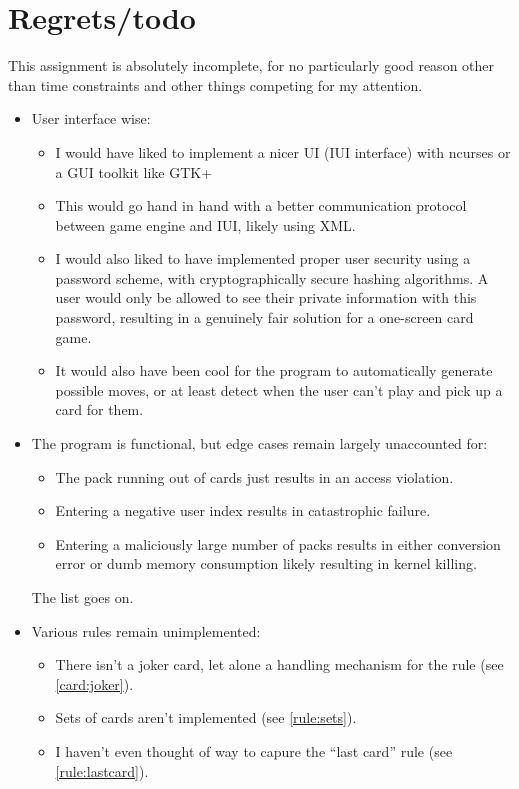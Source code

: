 \documentclass[fleqn,a4paper,11pt]{article}
\begin{document}
    \section{Regrets/todo}

    This assignment is absolutely incomplete, for no particularly good reason
    other than time constraints and other things competing for my attention.

    \begin{itemize}
    \item User interface wise:
        \begin{itemize}
        \item I would have liked to implement a nicer UI (IUI interface) with
              ncurses or a GUI toolkit like GTK+
        \item This would go hand in hand with a better communication protocol
              between game engine and IUI, likely using XML.
        \item I would also liked to have implemented proper user security using
              a password scheme, with cryptographically secure hashing
              algorithms. A user would only be allowed to see their private
              information with this password, resulting in a genuinely fair
              solution for a one-screen card game.
        \item It would also have been cool for the program to automatically
              generate possible moves, or at least detect when the user can't
              play and pick up a card for them.
        \end{itemize}
    \item The program is functional, but edge cases remain largely unaccounted
          for:
        \begin{itemize}
        \item The pack running out of cards just results in an access violation.
        \item Entering a negative user index results in catastrophic failure.
        \item Entering a maliciously large number of packs results in either
              conversion error or dumb memory consumption likely resulting in
              kernel killing.
        \end{itemize}
    The list goes on.
    \item Various rules remain unimplemented:
        \begin{itemize}
        \item There isn't a joker card, let alone a handling mechanism for the
              rule (see \ref{card:joker}).
        \item Sets of cards aren't implemented (see \ref{rule:sets}).
        \item I haven't even thought of way to capure the ``last card'' rule
              (see \ref{rule:lastcard}).
        \end{itemize}
    \end{itemize}
\end{document}
